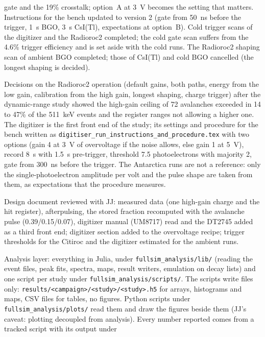 \documentclass[11pt]{article}
\newcommand{\code}[1]{\texttt{#1}}
\newcommand{\us}{\textmu s\xspace}
\newcommand{\csitl}{CsI(Tl)\xspace}
\begin{document}
\begin{description}
  gate and the 19\% crosstalk; option~A at 3~V becomes the setting that
  matters. Instructions for the bench updated to version 2 (gate from 50~ns
  before the trigger, 1~\us BGO, 3~\us \csitl, expectations at option~B).
  Cold trigger scans of the digitizer and the Radioroc2 completed; the cold
  gate scan suffers from the 4.6\% trigger efficiency and is set aside with
  the cold runs. The Radioroc2 shaping scan of ambient BGO completed; those
  of \csitl and cold BGO cancelled (the longest shaping is decided).
\item[18 Oct 2026] Decisions on the Radioroc2 operation (default gains,
  both paths, energy from the low gain, calibration from the high gain,
  longest shaping, charge trigger) after the dynamic-range study showed the
  high-gain ceiling of 72 avalanches exceeded in 14 to 47\% of the 511~keV
  events and the register ranges not allowing a higher one. The digitizer
  is the first front end of the study; its settings and procedure for the
  bench written as \code{digitiser\_run\_instructions\_and\_procedure.tex}
  with two options (gain 4 at 3~V of overvoltage if the noise allows, else
  gain 1 at 5~V), record 8~\us with 1.5~\us pre-trigger, threshold 7.5
  photoelectrons with majority 2, gate from 300~ns before the trigger. The
  Antarctica runs are not a reference: only the single-photoelectron
  amplitude per volt and the pulse shape are taken from them, as
  expectations that the procedure measures.
\item[16 Oct 2026] Design document reviewed with JJ: measured data (one
  high-gain charge and the hit register), afterpulsing, the stored fraction
  recomputed with the avalanche pulse (0.39/0.15/0.07), digitizer manual
  (UM8717) read and the DT2745 added as a third front end; digitizer section
  added to the overvoltage recipe; trigger thresholds for the Citiroc and
  the digitizer estimated for the ambient runs.
\item[17 Oct 2026] Analysis layer: everything in Julia, under
  \code{fullsim\_analysis/lib/} (reading the event files, peak fits,
  spectra, maps, result writers, emulation on decay lists) and one script
  per study under \code{fullsim\_analysis/scripts/}. The scripts write
  files only: \code{results/<campaign>/<study>/<study>.h5} for arrays,
  histograms and maps, CSV files for tables, no figures. Python scripts
  under \code{fullsim\_analysis/plots/} read them and draw the figures
  beside them (JJ's caveat: plotting decoupled from analysis). Every
  number reported comes from a tracked script with its output under

\end{description}
\end{document}
